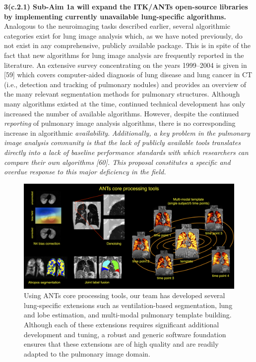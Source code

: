 \documentclass[11pt,]{article}
\begin{document}
\textbf{3(c.2.1) Sub-Aim 1a will expand the ITK/ANTs open-source
libraries by implementing currently unavailable lung-specific
algorithms.} Analogous to the neuroimaging tasks described earlier,
several algorithmic categories exist for lung image analysis which, as
we have noted previously, do not exist in any comprehensive, publicly
available package. This is in spite of the fact that new algorithms for
lung image analysis are frequently reported in the literature. An
extensive survey concentrating on the years 1999--2004 is given in
{[}59{]} which covers computer-aided diagnosis of lung disease and lung
cancer in CT (i.e., detection and tracking of pulmonary nodules) and
provides an overview of the many relevant segmentation methods for
pulmonary structures. Although many algorithms existed at the time,
continued technical development has only increased the number of
available algorithms. However, despite the continued \emph{reporting} of
pulmonary image analysis algorithms, there is no corresponding increase
in algorithmic \emph{availability}. \emph{Additionally, a key problem in
the pulmonary image analysis community is that the lack of publicly
available tools translates directly into a lack of baseline performance
standards with which researchers can compare their own algorithms
{[}60{]}. This proposal constitutes a specific and overdue response to
this major deficiency in the field.}

\begin{figure}[htbp]
\centering
\includegraphics{Figs/coreANtsToolsLung.png}
\caption{Using ANTs core processing tools, our team has developed
several lung-specific extensions such as ventilation-based segmentation,
lung and lobe estimation, and multi-modal pulmonary template building.
Although each of these extensions requires significant additional
development and tuning, a robust and generic software foundation ensures
that these extensions are of high quality and are readily adapted to the
pulmonary image domain.}
\end{figure}
\end{document}
